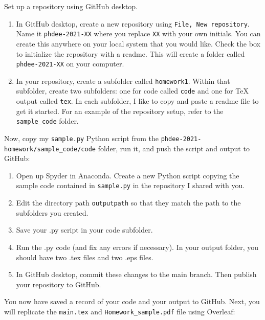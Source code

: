 \documentclass{article}
\begin{document}
Set up a repository using GitHub desktop.
\begin{enumerate}
    \item In GitHub desktop, create a new repository using \verb!File, New repository!.  Name it \verb!phdee-2021-XX! where you replace \verb!XX! with your own initials. You can create this anywhere on your local system that you would like. Check the box to initialize the repository with a readme.  This will create a folder called \verb!phdee-2021-XX! on your computer.
    \item In your repository, create a subfolder called \verb!homework1!.  Within that subfolder, create two subfolders: one for code called \verb!code! and one for TeX output called \verb!tex!.  In each subfolder, I like to copy and paste a readme file  to get it started.  For an example of the repository setup, refer to the \verb!sample_code! folder.
\end{enumerate}
Now, copy my \verb!sample.py! Python script from the \verb!phdee-2021-homework/sample_code/code! folder, run it, and push the script and output to GitHub:
\begin{enumerate}
    \item Open up Spyder in Anaconda.  Create a new Python script copying the sample code contained in \verb!sample.py! in the repository I shared with you.
    \item Edit the directory path \verb!outputpath! so that they match the path to the subfolders you created.
    \item Save your .py script in your code subfolder.
    \item Run the .py code (and fix any errors if necessary).  In your output folder, you should have two .tex files and two .eps files.
    \item In GitHub desktop, commit these changes to the main branch.  Then publish your repository to GitHub.
\end{enumerate}
You now have saved a record of your code and your output to GitHub.  Next, you will replicate the \verb!main.tex! and \verb!Homework_sample.pdf! file using Overleaf:
\end{document}
